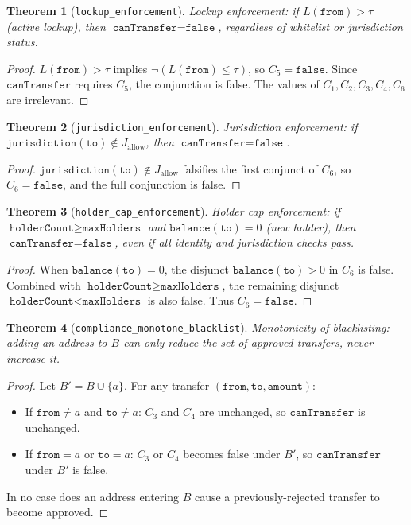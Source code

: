 \documentclass[11pt]{article}
\newtheorem{theorem}{Theorem}
\begin{document}
\begin{theorem}[\texttt{lockup\_enforcement}]
Lockup enforcement: if $L(\texttt{from}) > \tau$ (active lockup), then $\texttt{canTransfer} = \texttt{false}$, regardless of whitelist or jurisdiction status.
\end{theorem}
\begin{proof}
$L(\texttt{from}) > \tau$ implies $\neg(L(\texttt{from}) \leq \tau)$, so $C_5 = \texttt{false}$. Since $\texttt{canTransfer}$ requires $C_5$, the conjunction is false. The values of $C_1, C_2, C_3, C_4, C_6$ are irrelevant.
\end{proof}

\begin{theorem}[\texttt{jurisdiction\_enforcement}]
Jurisdiction enforcement: if $\texttt{jurisdiction}(\texttt{to}) \notin J_{\text{allow}}$, then $\texttt{canTransfer} = \texttt{false}$.
\end{theorem}
\begin{proof}
$\texttt{jurisdiction}(\texttt{to}) \notin J_{\text{allow}}$ falsifies the first conjunct of $C_6$, so $C_6 = \texttt{false}$, and the full conjunction is false.
\end{proof}

\begin{theorem}[\texttt{holder\_cap\_enforcement}]
Holder cap enforcement: if $\texttt{holderCount} \geq \texttt{maxHolders}$ and $\texttt{balance}(\texttt{to}) = 0$ (new holder), then $\texttt{canTransfer} = \texttt{false}$, even if all identity and jurisdiction checks pass.
\end{theorem}
\begin{proof}
When $\texttt{balance}(\texttt{to}) = 0$, the disjunct $\texttt{balance}(\texttt{to}) > 0$ in $C_6$ is false. Combined with $\texttt{holderCount} \geq \texttt{maxHolders}$, the remaining disjunct $\texttt{holderCount} < \texttt{maxHolders}$ is also false. Thus $C_6 = \texttt{false}$.
\end{proof}

\begin{theorem}[\texttt{compliance\_monotone\_blacklist}]
Monotonicity of blacklisting: adding an address to $B$ can only reduce the set of approved transfers, never increase it.
\end{theorem}
\begin{proof}
Let $B' = B \cup \{a\}$. For any transfer $(\texttt{from}, \texttt{to}, \texttt{amount})$:
\begin{itemize}
  \item If $\texttt{from} \neq a$ and $\texttt{to} \neq a$: $C_3$ and $C_4$ are unchanged, so $\texttt{canTransfer}$ is unchanged.
  \item If $\texttt{from} = a$ or $\texttt{to} = a$: $C_3$ or $C_4$ becomes false under $B'$, so $\texttt{canTransfer}$ under $B'$ is false.
\end{itemize}
In no case does an address entering $B$ cause a previously-rejected transfer to become approved.
\end{proof}
\end{document}
